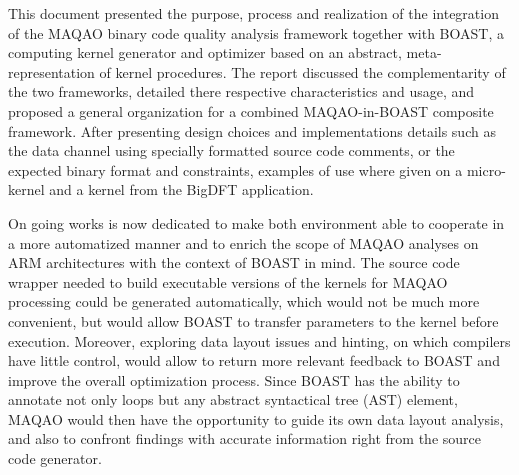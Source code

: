 \documentclass[11pt, a4paper, twoside]{montblanc2}
\begin{document}
This document presented the purpose, process and realization of the integration 
of the MAQAO binary code quality analysis framework together with BOAST, a 
computing kernel generator and optimizer based on an abstract, 
meta-representation of kernel procedures. The report discussed the 
complementarity of the two frameworks, detailed there respective characteristics 
and usage, and proposed a general organization for a combined MAQAO-in-BOAST 
composite framework. After presenting design choices and implementations details 
such as the data channel using specially formatted source code comments, or the 
expected binary format and constraints, examples of use where given on a 
micro-kernel and a kernel from the BigDFT application.

On going works is now dedicated to make both environment able to cooperate in a 
more automatized manner and to enrich the scope of MAQAO analyses on ARM 
architectures with the context of BOAST in mind. The source code wrapper needed 
to build executable versions of the kernels for MAQAO processing could be 
generated automatically, which would not be much more convenient, but would 
allow BOAST to transfer parameters to the kernel before execution. Moreover, 
exploring data layout issues and hinting, on which compilers have little 
control, would allow to return more relevant feedback to BOAST and improve the 
overall optimization process. Since BOAST has the ability to annotate not only 
loops but any abstract syntactical tree (AST) element, MAQAO would then have the 
opportunity to guide its own data layout analysis, and also to confront findings 
with accurate information right from the source code generator.



\end{document}
